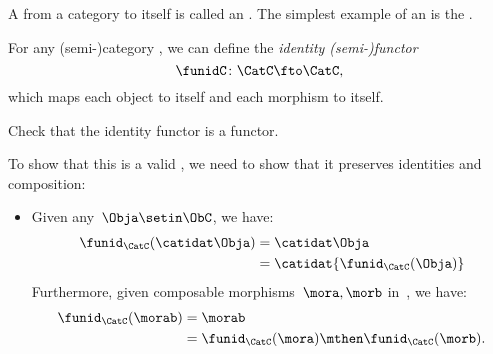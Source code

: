 
A  from a category to itself is called an .
The simplest example of an  is the .

\begin{definition}\label{def:identity-semifunctor}
    For any (semi-)category \CatC, we can define the \emph{identity (semi-)functor}
    \begin{equation}
        \funidC \colon \CatC \fto \CatC,
    \end{equation}
    which maps each object to itself and each morphism to itself.
\end{definition}

\begin{exercise}
    Check that the identity functor is a functor.
\end{exercise}
\begin{solution}
    To show that this is a valid , we need to show that it preserves identities and composition:
    \begin{itemize}
        \item Given any~$\Obja \setin \ObC$, we have:
              \begin{equation}
                  \begin{aligned}
                      \funid_{\CatC}(\catidat\Obja) & =\catidat\Obja \\
                                                    & =\catidat{\funid_{\CatC}(\Obja)}
                  \end{aligned}
              \end{equation}
              Furthermore, given composable morphisms~$\mora,\morb$ in~\CatC, we have:
              \begin{equation}
                  \begin{aligned}
                      \funid_{\CatC}(\morab) & =\morab \\
                                             & =\funid_{\CatC}(\mora)\mthen \funid_{\CatC} (\morb).
                  \end{aligned}
              \end{equation}
    \end{itemize}
\end{solution}




